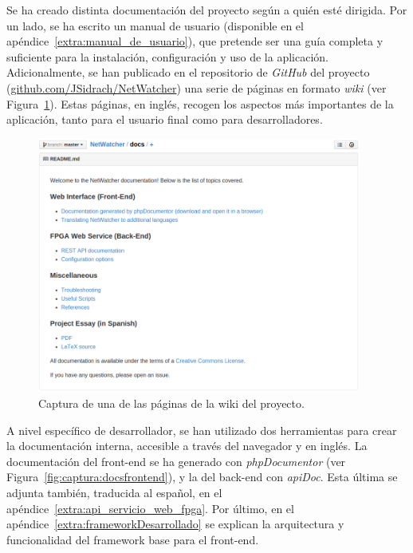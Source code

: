 Se ha creado distinta documentación del proyecto según a quién esté dirigida.
Por un lado, se ha escrito un manual de usuario (disponible en el apéndice~\ref{extra:manual_de_usuario}), que pretende ser una guía completa y suficiente para la instalación, configuración y uso de la aplicación.
Adicionalmente, se han publicado en el repositorio de \textit{GitHub} del proyecto (\url{github.com/JSidrach/NetWatcher}) una serie de páginas en formato \textit{wiki} (ver Figura~\ref{fig:captura:wiki}).
Estas páginas, en inglés, recogen los aspectos más importantes de la aplicación, tanto para el usuario final como para desarrolladores.

\begin{figure}[!htp]
  \centering
  \includegraphics[width=0.95\textwidth,clip=true]{graphics/capturas/github_docs}
  \caption{Captura de una de las páginas de la wiki del proyecto.}
  \label{fig:captura:wiki}
\end{figure}

A nivel específico de desarrollador, se han utilizado dos herramientas para crear la documentación interna, accesible a través del navegador y en inglés.
La documentación del \gls{front-end} se ha generado con \textit{phpDocumentor} (ver Figura~\ref{fig:captura:docsfrontend}), y la del \gls{back-end} con \textit{apiDoc}.
Esta última se adjunta también, traducida al español, en el apéndice~\ref{extra:api_servicio_web_fpga}.
Por último, en el apéndice~\ref{extra:frameworkDesarrollado} se explican la arquitectura y funcionalidad del \gls{framework} base para el \gls{front-end}.

